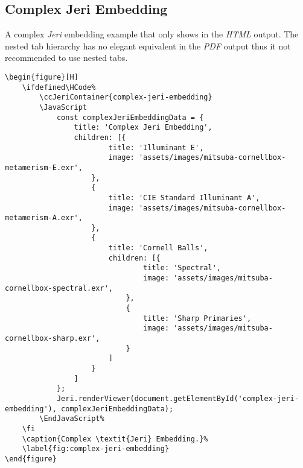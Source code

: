 \subsection*{Complex Jeri Embedding}%

A complex \textit{Jeri} embedding example that only shows in the \textit{HTML} output.
The nested tab hierarchy has no elegant equivalent in the \textit{PDF} output thus it not recommended to use nested tabs.

\begin{lstlisting}[caption={Complex \textit{Jeri} Embedding.}]
\begin{figure}[H]
    \ifdefined\HCode%
        \ccJeriContainer{complex-jeri-embedding}
        \JavaScript
            const complexJeriEmbeddingData = {
                title: 'Complex Jeri Embedding',
                children: [{
                        title: 'Illuminant E',
                        image: 'assets/images/mitsuba-cornellbox-metamerism-E.exr',
                    },
                    {
                        title: 'CIE Standard Illuminant A',
                        image: 'assets/images/mitsuba-cornellbox-metamerism-A.exr',
                    },
                    {
                        title: 'Cornell Balls',
                        children: [{
                                title: 'Spectral',
                                image: 'assets/images/mitsuba-cornellbox-spectral.exr',
                            },
                            {
                                title: 'Sharp Primaries',
                                image: 'assets/images/mitsuba-cornellbox-sharp.exr',
                            }
                        ]
                    }
                ]
            };
            Jeri.renderViewer(document.getElementById('complex-jeri-embedding'), complexJeriEmbeddingData);
        \EndJavaScript%
    \fi
    \caption{Complex \textit{Jeri} Embedding.}%
    \label{fig:complex-jeri-embedding}
\end{figure}
\end{lstlisting}

